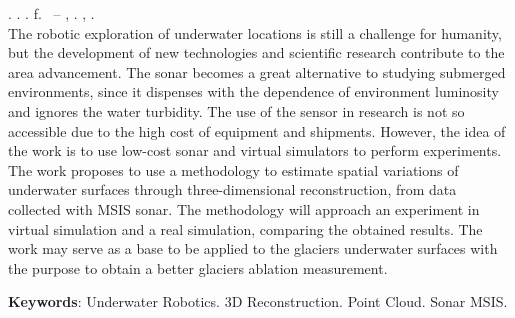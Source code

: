 
\begin{resumo}[ABSTRACT]
\begin{SingleSpacing}

\imprimirautorcitacao. \imprimirtitleabstract. \imprimirdata. \pageref {LastPage} f. \imprimirprojeto\ – \imprimirprograma, \imprimirinstituicao. \imprimirlocal, \imprimirdata.\\


The robotic exploration of underwater locations is still a challenge for humanity, but the development of new technologies and scientific research contribute to the area advancement.
The sonar becomes a great alternative to studying submerged environments, since it dispenses with the dependence of environment luminosity and ignores the water turbidity.
The use of the sensor in research is not so accessible due to the high cost of equipment and shipments.
However, the idea of the work is to use low-cost sonar and virtual simulators to perform experiments.
The work proposes to use a methodology to estimate spatial variations of underwater surfaces through three-dimensional reconstruction, from data collected with MSIS sonar.
The methodology will approach an experiment in virtual simulation and a real simulation, comparing the obtained results.
The work may serve as a base to be applied to the glaciers underwater surfaces with the purpose to obtain a better glaciers ablation measurement.

\vspace{2em}
\textbf{Keywords}: Underwater Robotics. 3D Reconstruction. Point Cloud. Sonar MSIS.

\end{SingleSpacing}
\end{resumo}

